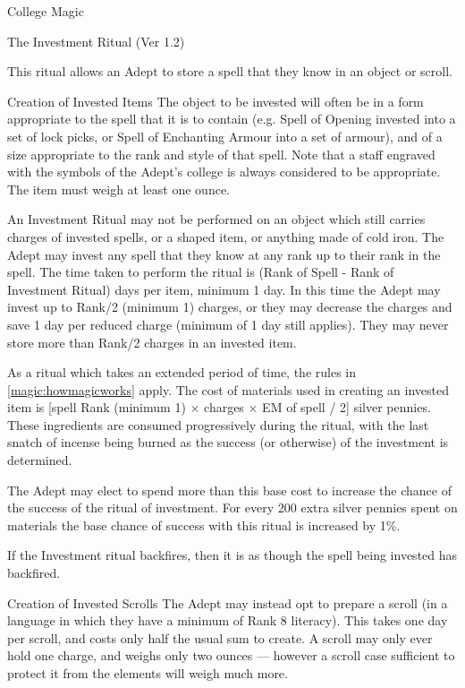 \begin{Chapter}{College Magic}
\begin{ritual}{The Investment Ritual (Ver 1.2)}
\label{ritual:investment}
\begin{effects}
This ritual allows an Adept to store a spell that they know in an
object or scroll.

\begin{Description}
\item[Creation of Invested Items] The object to be invested will often
  be in a form appropriate to the spell that it is to contain (e.g.
  Spell of Opening invested into a set of lock picks, or Spell of
  Enchanting Armour into a set of armour), and of a size appropriate
  to the rank and style of that spell.  Note that a staff engraved
  with the symbols of the Adept’s college is always considered to be
  appropriate. The item must weigh at least one ounce.

An Investment Ritual may not be performed on an object which still
carries charges of invested spells, or a shaped item, or anything made
of cold iron.  The Adept may invest any spell that they know at any
rank up to their rank in the spell.  The time taken to perform the
ritual is (Rank of Spell - Rank of Investment Ritual) days per item,
minimum 1 day.  In this time the Adept may invest up to Rank/2
(minimum 1) charges, or they may decrease the charges and save 1 day
per reduced charge (minimum of 1 day still applies). They may never
store more than Rank/2 charges in an invested item.

As a ritual which takes an extended period of time, the rules in
\ref{magic:howmagicworks} apply.  The cost of materials used in
creating an invested item is [spell Rank (minimum 1) × charges × EM of
  spell / 2] silver pennies.  These ingredients are consumed
progressively during the ritual, with the last snatch of incense being
burned as the success (or otherwise) of the investment is determined.

The Adept may elect to spend more than this base cost to increase the
chance of the success of the ritual of investment.  For every 200
extra silver pennies spent on materials the base chance of success
with this ritual is increased by 1\%.

If the Investment ritual backfires, then it is as though the spell
being invested has backfired.

\item[Creation of Invested Scrolls] The Adept may instead opt to
  prepare a scroll (in a language in which they have a minimum of Rank
  8 literacy).  This takes one day per scroll, and costs only half the
  usual sum to create.  A scroll may only ever hold one charge, and
  weighs only two ounces — however a scroll case sufficient to protect
  it from the elements will weigh much more.


\end{Description}
\end{effects}
\end{ritual}
\end{Chapter}
